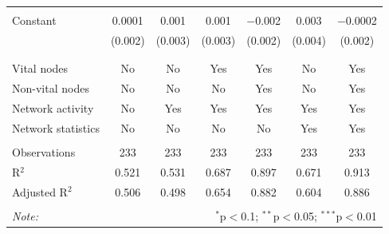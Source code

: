\begin{table}[!htbp]
\begin{tabular}{@{\extracolsep{5pt}}lcccccc}
  & & & & & & \\ 
 Constant & 0.0001 & 0.001 & 0.001 & $-$0.002 & 0.003 & $-$0.0002 \\ 
  & (0.002) & (0.003) & (0.003) & (0.002) & (0.004) & (0.002) \\ 
  & & & & & & \\ 
\hline \\[-1.8ex] 
Vital nodes & No & No & Yes & Yes & No & Yes \\ 
Non-vital nodes & No & No & No & Yes & No & Yes \\ 
Network activity & No & Yes & Yes & Yes & Yes & Yes \\ 
Network statistics & No & No & No & No & Yes & Yes \\ 
\hline &  &  &  &  &  &  \\ 
Observations & 233 & 233 & 233 & 233 & 233 & 233 \\ 
R$^{2}$ & 0.521 & 0.531 & 0.687 & 0.897 & 0.671 & 0.913 \\ 
Adjusted R$^{2}$ & 0.506 & 0.498 & 0.654 & 0.882 & 0.604 & 0.886 \\ 
\hline 
\hline \\[-1.8ex] 
\textit{Note:}  & \multicolumn{6}{r}{$^{*}$p$<$0.1; $^{**}$p$<$0.05; $^{***}$p$<$0.01} \\ 
\end{tabular} 
\end{table} 

